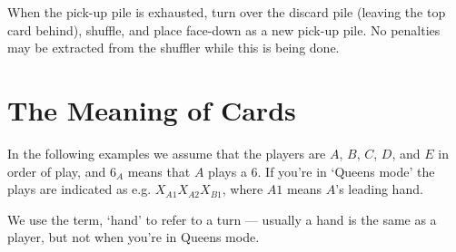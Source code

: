 \documentclass[12pt]{article}
\begin{document}
When the pick-up pile is exhausted, turn over the discard pile (leaving the top card behind),
shuffle, and place face-down as a new pick-up pile.  No penalties may be extracted from the
shuffler while this is being done.

\section{The Meaning of Cards}
\label{specialCards}

In the following examples we assume that the players are $A$, $B$, $C$, $D$, and $E$ in order of play,
and $6_A$ means that $A$ plays a 6.  If you're in `Queens mode' the plays are indicated as e.g. $X_{A1} X_{A2} X_{B1}$,
where $A1$ means $A$'s leading hand.

We use the term, `hand' to refer to a turn --- usually a hand is the same as a player, but not when
you're in Queens mode.
\end{document}
